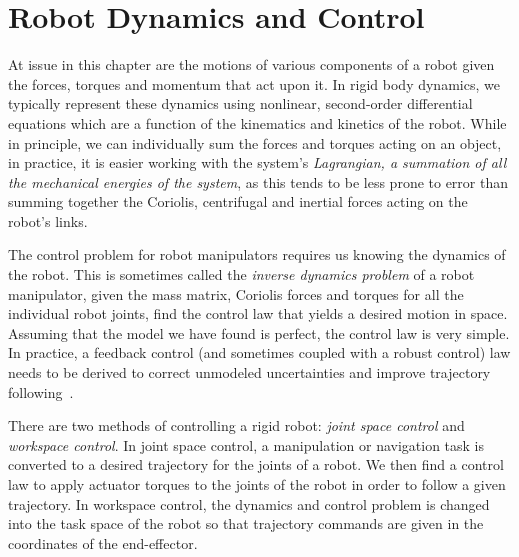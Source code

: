 \chapter{Robot Dynamics and Control}
%
At issue in this chapter are the motions of various components of a robot given the forces, torques and momentum that act upon it. In rigid body dynamics, we typically represent these dynamics using nonlinear, second-order differential equations which are a function of the kinematics and kinetics of the robot.  While in principle, we can individually sum the forces and torques acting on an object, in practice, it is easier working with the system's \textit{Lagrangian, a summation of all the mechanical energies of the system}, as this tends to be less prone to error than summing together the Coriolis, centrifugal and inertial forces acting on the robot's links. 

The control problem for robot manipulators requires us knowing the dynamics of the robot. This is sometimes called the \textit{inverse dynamics problem} of a robot manipulator, \ie given the mass matrix, Coriolis forces and torques for all the individual robot joints, find the control law that yields a desired motion in space. Assuming that the model we have found is perfect, the control law is very simple. In practice, a feedback control (and sometimes coupled with a robust control) law needs to be derived to correct unmodeled uncertainties and improve trajectory following~\cite{Ogunmolu18IROS}.

There are two methods of controlling a rigid robot: \textit{joint space control} and \textit{workspace control}. In joint space control, a manipulation or navigation task is converted to a desired trajectory for the joints of a robot. We then find a control law to apply actuator torques to the joints of the robot in order to follow a given trajectory. In workspace control, the dynamics and control problem is changed into the task space of the robot so that trajectory commands are given in the coordinates of the end-effector.

